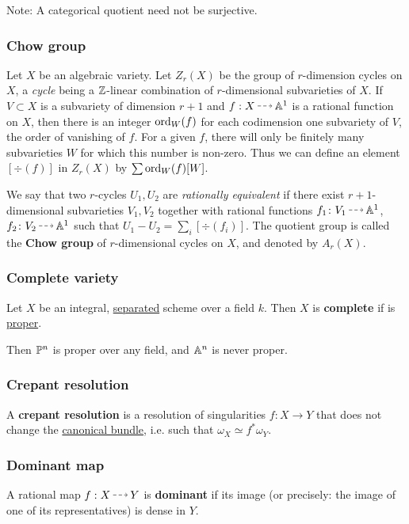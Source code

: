 \documentclass[11pt, english]{article}
\begin{document}
Note: A categorical quotient need not be surjective.

\subsubsection{Chow group}
\label{chowgroup}
Let $X$ be an algebraic variety. Let $Z_r(X)$ be the group of $r$-dimension cycles on $X$, a \emph{cycle} being a $\mathbb{Z}$-linear combination of $r$-dimensional subvarieties of $X$. If $V \subset X$ is a subvariety of dimension $r+1$ and $f:X \rmap \Aa^1$ is a rational function on $X$, then there is an integer $\operatorname{ord}_W(f)$ for each codimension one subvariety of $V$, the order of vanishing of $f$. For a given $f$, there will only be finitely many subvarieties $W$ for which this number is non-zero. Thus we can define an element $[\div(f)]$ in $Z_r(X)$ by $\sum \operatorname{ord}_W(f) [W]$.

We say that two $r$-cycles $U_1,U_2$  are \emph{rationally equivalent} if there exist $r+1$-dimensional subvarieties $V_1,V_2$ together with rational functions $f_1\colon V_1 \rmap \Aa^1$, $f_2 \colon V_2 \rmap \Aa^1$ such that $U_1 - U_2 = \sum_i [\div(f_i)]$. The quotient group is called the \textbf{Chow group} of $r$-dimensional cycles on $X$, and denoted by $A_r(X)$. 


\subsubsection{Complete variety}
\label{completevariety}
Let $X$ be an  integral, \hyperref[separated]{separated} scheme over a field $k$. Then $X$ is  \textbf{complete} if is \hyperref[proper]{proper}.

Then $\mathbb{P}^n$ is proper over any field, and $\mathbb{A}^n$ is never proper.

\subsubsection{Crepant resolution}
\label{crepantresolution}
A \textbf{crepant resolution} is a resolution of singularities $f:X \to Y$ that does not change the \hyperref[canonicalsheaf]{canonical bundle}, i.e. such that $\omega_X \simeq f^\ast \omega_Y$.

\subsubsection{Dominant map}
\label{dominantmap}

A rational map $f:X \rmap Y$ is  \textbf{dominant} if its image (or precisely: the image of one of its representatives) is dense in $Y$. 
\end{document}
